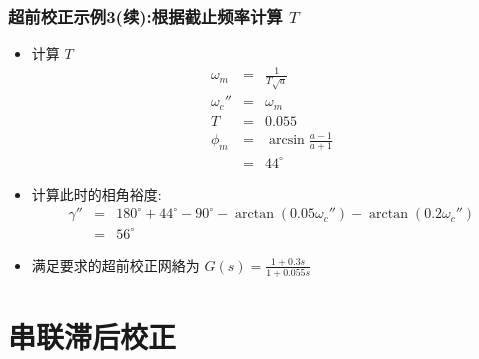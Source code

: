 \documentclass[table]{article}
\begin{document}
\begin{frame}
\frametitle{超前校正示例3(续):根据截止频率计算  $T$}
\label{sec-2-2-10}

\begin{itemize}
\item 计算 $T$
       \begin{eqnarray*}
       \omega_m &=& \frac{1}{T\sqrt{a}} \\
       \omega_c'' &=& \omega_m \\
       T &=& 0.055 \\
       \phi_m &=& \arcsin\frac{a-1}{a+1} \\
       &=& 44^{\circ} 
       \end{eqnarray*}
\item <2->计算此时的相角裕度: 
       \begin{eqnarray*}
       \gamma'' &=& 180^{\circ}+44^{\circ}-90^{\circ}-\arctan(0.05\omega_c'')-\arctan(0.2\omega_c'') \\
       	&=& 56^{\circ}
       \end{eqnarray*}
\item <2->满足要求的超前校正网絡为  $G(s)=\frac{1+0.3s}{1+0.055s}$
\end{itemize}
\end{frame}
\section{串联滞后校正}
\label{sec-3}
\end{document}
